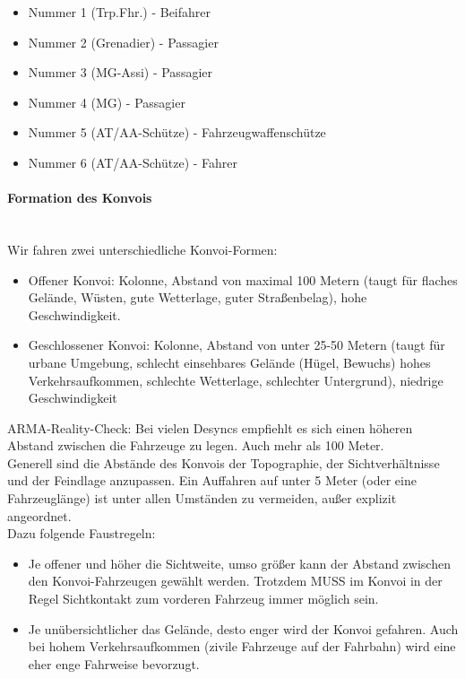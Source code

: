 	\begin{itemize}
		\item Nummer 1 (Trp.Fhr.) - Beifahrer
		\item Nummer 2 (Grenadier) - Passagier
		\item Nummer 3 (MG-Assi) - Passagier
		\item Nummer 4 (MG) - Passagier
		\item Nummer 5 (AT/AA-Schütze) - Fahrzeugwaffenschütze
		\item Nummer 6 (AT/AA-Schütze) - Fahrer
	\end{itemize}

\paragraph{Formation des Konvois} \ \\
	Wir fahren zwei unterschiedliche Konvoi-Formen:
	\begin{itemize}
		\item Offener Konvoi: Kolonne, Abstand von maximal 100 Metern (taugt für flaches Gelände, Wüsten, gute Wetterlage, guter Straßenbelag), hohe Geschwindigkeit.
		\item Geschlossener Konvoi: Kolonne, Abstand von unter 25-50 Metern (taugt für urbane Umgebung, schlecht einsehbares Gelände (Hügel, Bewuchs) hohes Verkehrsaufkommen, schlechte Wetterlage, schlechter Untergrund), niedrige Geschwindigkeit
	\end{itemize}

	ARMA-Reality-Check: Bei vielen Desyncs empfiehlt es sich einen höheren Abstand zwischen die Fahrzeuge zu legen. Auch mehr als 100 Meter. \\
	Generell sind die Abstände des Konvois der Topographie, der Sichtverhältnisse und der Feindlage anzupassen. Ein Auffahren auf unter 5 Meter (oder eine Fahrzeuglänge) ist unter allen Umständen zu vermeiden, außer explizit angeordnet. \\
	Dazu folgende Faustregeln:

	\begin{itemize}
		\item Je offener und höher die Sichtweite, umso größer kann der Abstand zwischen den Konvoi-Fahrzeugen gewählt werden. Trotzdem MUSS im Konvoi in der Regel Sichtkontakt zum vorderen Fahrzeug immer möglich sein.
		\item Je unübersichtlicher das Gelände, desto enger wird der Konvoi gefahren. Auch bei hohem Verkehrsaufkommen (zivile Fahrzeuge auf der Fahrbahn) wird eine eher enge Fahrweise bevorzugt.
	\end{itemize}

